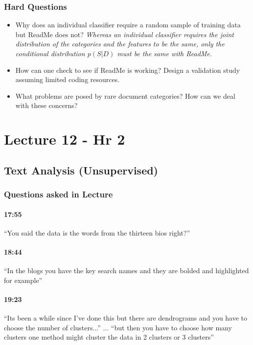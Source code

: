\documentclass[11pt]{article}
\begin{document}
\subsubsection{Hard Questions}

\begin{itemize}
\item Why does an individual classifier require a random sample of training data but ReadMe does not? \textit{Whereas an individual classifier requires the joint distribution of the categories and the features to be the same, only the conditional distribution $p(S|D)$ must be the same with ReadMe.}
\item How can one check to see if ReadMe is working?  Design a validation study assuming limited coding resources.
\item What problems are posed by rare document categories?  How can we deal with these concerns?
\end{itemize}

\section{Lecture 12 - Hr 2}

\subsection{Text Analysis (Unsupervised)}

\subsubsection{Questions asked in Lecture}

\paragraph{17:55} ``You said the data is the words from the thirteen bios right?''  
 
\paragraph{18:44} ``In the blogs you have the key search names and they are bolded and highlighted for example''
 
\paragraph{19:23} ``Its been a while since I've done this but there are dendrograms and you have to choose the number of clusters...'' ... ``but then you have to choose how many clusters one method might cluster the data in 2 clusters or 3 clusters''
\end{document}

